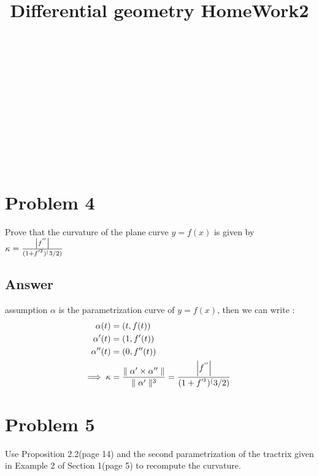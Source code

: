 \documentclass[
	12pt, %
]{fphw}
\title{Differential geometry HomeWork2}
\author{}
\theoremstyle{plain}
\begin{document}
\begin{center}
	\noindent{}\\[5pt]
\end{center}
\begin{center}
    \noindent{}\\[5pt]
    \noindent{}\\[5pt]
    \noindent{}\\[5pt]
    \noindent{}\\[5pt]

\end{center}
‌‌‌‌\begin{center}
    \noindent{}\\[5pt]
\end{center}
\section*{Problem 4}
\begin{problem}
     Prove that the curvature of the plane curve \(y=f(x)\) is given by \(\kappa=\frac{\abs{f^{''}}}{(1+f^{'^{2}})^(3/2)}\)
\end{problem}
\subsection*{Answer}
assumption $\alpha$ is the parametrization curve of \(y=f(x)\), then we can write :\\
\begin{align*}
     \alpha(t) &= (t,f(t))\\
     \alpha'(t) &= (1,f'(t))\\
     \alpha''(t) &= (0,f''(t))\\
     \implies\kappa &= \frac{\parallel{\alpha' \times \alpha''}\parallel}{\parallel\alpha'\parallel^3}=\frac{\abs{f^{''}}}{(1+f^{'^{2}})^(3/2)}\
\end{align*}
\section*{Problem 5}
\begin{problem}
     Use Proposition 2.2(page 14) and the second parametrization of the tractrix given in Example 2 of Section 1(page 5) to
      recompute the curvature.
\end{problem}
\end{document}
